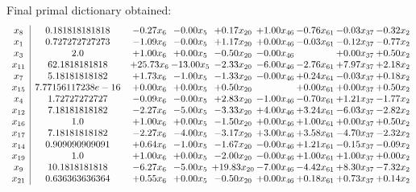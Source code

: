 \documentclass[8pt]{article}
\begin{document}
 Final primal dictionary obtained: 
\[\begin{array}{c| c c@{\hskip 2pt} c@{\hskip 2pt} c@{\hskip 2pt} c@{\hskip 2pt} c@{\hskip 2pt} c@{\hskip 2pt} c@{\hskip 2pt} }
 x_{8}   &  0.181818181818 & -0.27 x_{6} & -0.00 x_{5} & +  0.17 x_{20} & +  1.00 x_{46} & -0.76 x_{61} & -0.03 x_{37} & -0.32 x_{2}\\
 x_{1}   &  0.727272727273 & -1.09 x_{6} & -0.00 x_{5} & +  1.17 x_{20} & +  0.00 x_{46} & -0.03 x_{61} & -0.12 x_{37} & -0.77 x_{2}\\
 x_{3}   &  2.0 & +  1.00 x_{6} & +  0.00 x_{5} & -0.50 x_{20} & -0.00 x_{46} &   & +  0.00 x_{37} & +  0.50 x_{2}\\
 x_{11}   &  62.1818181818 & + 25.73 x_{6} & -13.00 x_{5} & -2.33 x_{20} & -6.00 x_{46} & -2.76 x_{61} & +  7.97 x_{37} & +  2.18 x_{2}\\
 x_{7}   &  5.18181818182 & +  1.73 x_{6} & -1.00 x_{5} & -1.33 x_{20} & -0.00 x_{46} & +  0.24 x_{61} & -0.03 x_{37} & +  0.18 x_{2}\\
 x_{15}   &  7.77156117238e-16 & +  0.00 x_{6} & +  0.00 x_{5} & +  0.50 x_{20} &   & +  0.00 x_{61} & +  0.00 x_{37} & +  0.50 x_{2}\\
 x_{4}   &  1.72727272727 & -0.09 x_{6} & -0.00 x_{5} & +  2.83 x_{20} & -1.00 x_{46} & -0.70 x_{61} & +  1.21 x_{37} & -1.77 x_{2}\\
 x_{12}   &  7.18181818182 & -2.27 x_{6} & -5.00 x_{5} & -3.33 x_{20} & +  4.00 x_{46} & +  3.24 x_{61} & -6.03 x_{37} & -2.82 x_{2}\\
 x_{16}   &  1.0 & +  1.00 x_{6} & +  0.00 x_{5} & -1.50 x_{20} & +  0.00 x_{46} & +  1.00 x_{61} & +  0.00 x_{37} & +  0.50 x_{2}\\
 x_{17}   &  7.18181818182 & -2.27 x_{6} & -4.00 x_{5} & -3.17 x_{20} & +  3.00 x_{46} & +  3.58 x_{61} & -4.70 x_{37} & -2.32 x_{2}\\
 x_{14}   &  0.909090909091 & +  0.64 x_{6} & -1.00 x_{5} & -1.67 x_{20} & -0.00 x_{46} & +  1.21 x_{61} & -0.15 x_{37} & -0.09 x_{2}\\
 x_{19}   &  1.0 & +  1.00 x_{6} & +  0.00 x_{5} & -2.00 x_{20} & -0.00 x_{46} & +  1.00 x_{61} & +  1.00 x_{37} & +  0.00 x_{2}\\
 x_{9}   &  10.1818181818 & -6.27 x_{6} & -5.00 x_{5} & + 19.83 x_{20} & -7.00 x_{46} & -4.42 x_{61} & +  8.30 x_{37} & -7.32 x_{2}\\
 x_{21}   &  0.636363636364 & +  0.55 x_{6} & +  0.00 x_{5} & -0.50 x_{20} & +  0.00 x_{46} & +  0.18 x_{61} & +  0.73 x_{37} & +  0.14 x_{2}\\

\end{array}\]
\end{document}
